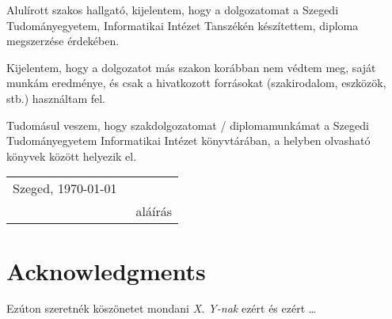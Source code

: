 \documentclass[12pt]{report}
\begin{document}

\noindent
Alulírott \makebox[4cm]{\dotfill} szakos hallgató, kijelentem, hogy a dolgozatomat a Szegedi Tudományegyetem, Informatikai Intézet \makebox[4cm]{\dotfill} Tanszékén készítettem, \makebox[4cm]{\dotfill} diploma megszerzése érdekében.

Kijelentem, hogy a dolgozatot más szakon korábban nem védtem meg, saját munkám eredménye, és csak a hivatkozott forrásokat (szakirodalom, eszközök, stb.) használtam fel.

Tudomásul veszem, hogy szakdolgozatomat / diplomamunkámat a Szegedi Tudományegyetem Informatikai Intézet könyvtárában, a helyben olvasható könyvek között helyezik el.

\vspace*{2cm}

\begin{tabular}{lc}
	Szeged, \today\
	\hspace{2cm} & \makebox[6cm]{\dotfill} \\
	& aláírás \\
\end{tabular}

\vspace*{4cm}

\chapter*{Acknowledgments}

Ezúton szeretnék köszönetet mondani \textit{X. Y-nak} ezért és ezért \ldots

%
%
\end{document}
